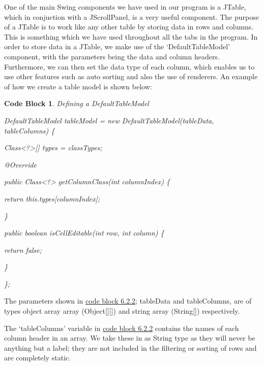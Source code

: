 \documentclass[12pt, a4paper, oneside]{book}
\newtheorem{codeblock}[theorem]{Code Block}
\numberwithin{equation}{section}
\begin{document}
One of the main Swing components we have used in our program is a JTable, which in conjuction with a JScrollPanel, is a very useful component. The purpose of a JTable is to work like any other table by storing data in rows and columns. This is something which we have used throughout all the tabs in the program. In order to store data in a JTable, we make use of the `DefaultTableModel' component, with the parameters being the data and column headers. Furthermore, we can then set the data type of each column, which enables us to use other features such as auto sorting and also the use of renderers. An example of how we create a table model is shown below:

\begin{codeblock} \label{Defining a DefaultTableModel}
  Defining a DefaultTableModel

  DefaultTableModel tableModel = new DefaultTableModel(tableData, tableColumns) \{
    
  \hspace{\parindent}Class<?>[] types = classTypes;

  \hspace{\parindent}@Override

  \hspace{\parindent}public Class<?> getColumnClass(int columnIndex) \{
  
  \hspace{\parindent}\hspace{\parindent}return this.types[columnIndex];
  
  \hspace{\parindent}\}

  \hspace{\parindent}public boolean isCellEditable(int row, int column) \{
  
  \hspace{\parindent}return false;
  
  \hspace{\parindent}\}
  
  \};
\end{codeblock}

The parameters shown in \hyperref[Defining a DefaultTableModel]{code block 6.2.2}; tableData and tableColumns, are of types object array array (Object[][]) and string array (String[]) respectively.

The `tableColumns' variable in \hyperref[Defining a DefaultTableModel]{code block 6.2.2} contains the names of each column header in an array. We take these in as String type as they will never be anything but a label; they are not included in the filtering or sorting of rows and are completely static.
\end{document}
